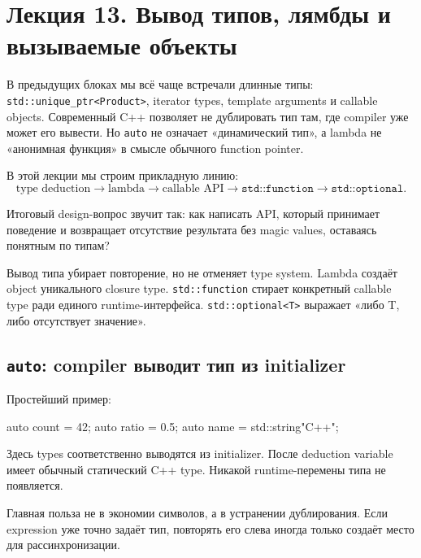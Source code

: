 \section{Лекция 13. Вывод типов, лямбды и вызываемые объекты}
\label{sec:lecture-13}

В предыдущих блоках мы всё чаще встречали длинные типы:
\texttt{std::unique\_ptr<Product>}, iterator types, template arguments и callable
objects. Современный C++ позволяет не дублировать тип там, где compiler уже
может его вывести. Но \texttt{auto} не означает «динамический тип», а lambda
не «анонимная функция» в смысле обычного function pointer.

В этой лекции мы строим прикладную линию:
\[
\text{type deduction}
\rightarrow
\text{lambda}
\rightarrow
\text{callable API}
\rightarrow
\texttt{std::function}
\rightarrow
\texttt{std::optional}.
\]

Итоговый design-вопрос звучит так: как написать API, который принимает
поведение и возвращает отсутствие результата без magic values, оставаясь
понятным по типам?

\begin{importantbox}
Вывод типа убирает повторение, но не отменяет type system. Lambda создаёт object
уникального closure type. \texttt{std::function} стирает конкретный callable
type ради единого runtime-интерфейса. \texttt{std::optional<T>} выражает
«либо T, либо отсутствует значение».
\end{importantbox}

\subsection{\texttt{auto}: compiler выводит тип из initializer}

Простейший пример:

\begin{cppcode}
auto count = 42;
auto ratio = 0.5;
auto name = std::string{"C++"};
\end{cppcode}

Здесь types соответственно выводятся из initializer. После deduction variable
имеет обычный статический C++ type. Никакой runtime-перемены типа не появляется.

\begin{whybox}
Главная польза не в экономии символов, а в устранении дублирования. Если
expression уже точно задаёт тип, повторять его слева иногда только создаёт место
для рассинхронизации.
\end{whybox}

